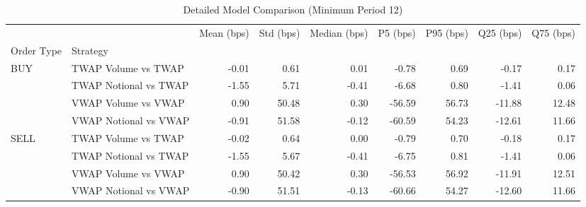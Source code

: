 \begin{table}
\caption{Detailed Model Comparison (Minimum Period 12)}
\label{tab:detailed_min_period_12}
\begin{tabular}{l|l|rrrrrrr}
\toprule
 &  & Mean (bps) & Std (bps) & Median (bps) & P5 (bps) & P95 (bps) & Q25 (bps) & Q75 (bps) \\
Order Type & Strategy &  &  &  &  &  &  &  \\
\midrule
\multirow[t]{4}{*}{BUY} & TWAP Volume vs TWAP & -0.01 & 0.61 & 0.01 & -0.78 & 0.69 & -0.17 & 0.17 \\
 & TWAP Notional vs TWAP & -1.55 & 5.71 & -0.41 & -6.68 & 0.80 & -1.41 & 0.06 \\
 & VWAP Volume vs VWAP & 0.90 & 50.48 & 0.30 & -56.59 & 56.73 & -11.88 & 12.48 \\
 & VWAP Notional vs VWAP & -0.91 & 51.58 & -0.12 & -60.59 & 54.23 & -12.61 & 11.66 \\
\cline{1-9}
\multirow[t]{4}{*}{SELL} & TWAP Volume vs TWAP & -0.02 & 0.64 & 0.00 & -0.79 & 0.70 & -0.18 & 0.17 \\
 & TWAP Notional vs TWAP & -1.55 & 5.67 & -0.41 & -6.75 & 0.81 & -1.41 & 0.06 \\
 & VWAP Volume vs VWAP & 0.90 & 50.42 & 0.30 & -56.53 & 56.92 & -11.91 & 12.51 \\
 & VWAP Notional vs VWAP & -0.90 & 51.51 & -0.13 & -60.66 & 54.27 & -12.60 & 11.66 \\
\cline{1-9}
\bottomrule
\end{tabular}
\end{table}
